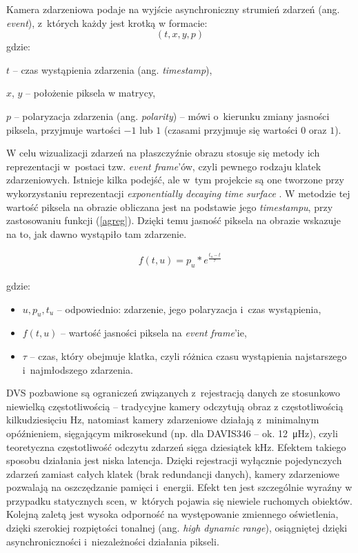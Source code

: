 Kamera zdarzeniowa podaje na wyjście asynchroniczny strumień zdarzeń (ang. \textit{event}), z~których każdy jest krotką w formacie: $$(t, x, y, p)$$ 
gdzie:

$t$ -- czas wystąpienia zdarzenia (ang. \textit{timestamp}),

$x$, $y$ -- położenie piksela w matrycy,

$p$ -- polaryzacja zdarzenia (ang. \textit{polarity}) -- mówi o~kierunku zmiany jasności piksela, przyjmuje wartości $-1$ lub $1$ (czasami przyjmuje się wartości $0$ oraz $1$).
\vspace{11px}

W celu wizualizacji zdarzeń na płaszczyźnie obrazu stosuje się metody ich reprezentacji w~postaci tzw. \textit{event frame}'ów, czyli pewnego rodzaju klatek zdarzeniowych. Istnieje kilka podejść, ale w~tym projekcie są one tworzone przy wykorzystaniu reprezentacji \textit{exponentially decaying time surface} \cite{Blachut_2023}. W metodzie tej wartość piksela na obrazie obliczana jest na podstawie jego \textit{timestampu}, przy zastosowaniu funkcji (\ref{agreg}). Dzięki temu jasność piksela na obrazie wskazuje na to, jak dawno wystąpiło tam zdarzenie. 

\begin{align}
    f(t, u) = p_u * e^{\frac{t_u - t}{\tau}} \label{agreg}
\end{align}

\noindent gdzie:
\begin{itemize}
    \item $u, p_u, t_u$ -- odpowiednio: zdarzenie, jego polaryzacja i~czas wystąpienia,
    \item$f(t, u)$ -- wartość jasności piksela na \textit{event frame}'ie,
    \item $\tau$ -- czas, który obejmuje klatka, czyli różnica czasu wystąpienia najstarszego i~najmłodszego zdarzenia.
\end{itemize}





DVS pozbawione są ograniczeń związanych z~rejestracją danych ze stosunkowo niewielką częstotliwością -- tradycyjne kamery odczytują obraz z częstotliwością kilkudziesięciu Hz, natomiast kamery zdarzeniowe działają z~minimalnym opóźnieniem, sięgającym mikrosekund (np. dla DAVIS346 -- ok. \SI{12}{\micro\Hz}), czyli teoretyczna częstotliwość odczytu zdarzeń sięga dziesiątek kHz. Efektem takiego sposobu działania jest niska latencja.
Dzięki rejestracji wyłącznie pojedynczych zdarzeń zamiast całych klatek (brak redundancji danych), kamery zdarzeniowe pozwalają na oszczędzanie pamięci i~energii. Efekt ten jest szczególnie wyraźny w przypadku statycznych scen, w~których pojawia się niewiele ruchomych obiektów. Kolejną zaletą jest wysoka odporność na występowanie zmiennego oświetlenia, dzięki szerokiej rozpiętości tonalnej (ang. \textit{high dynamic range}), osiągniętej dzięki asynchroniczności i~niezależności działania pikseli.

